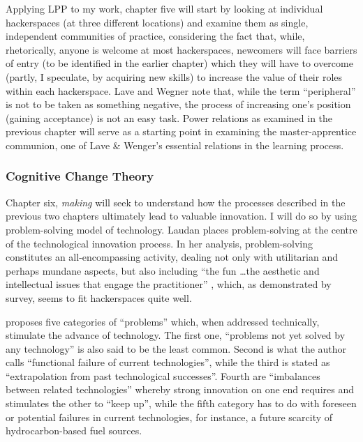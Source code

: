 Applying LPP to my work, chapter five will start by looking at individual hackerspaces (at three different locations) and examine them as single, independent communities of practice, considering the fact that, while, rhetorically, anyone is welcome at most hackerspaces, newcomers will face barriers of entry (to be identified in the earlier chapter) which they will have to overcome (partly, I speculate, by acquiring new skills) to increase the value of their roles within each hackerspace. Lave and Wegner note that, while the term ``peripheral'' is not to be taken as something negative, the process of increasing one's position (gaining acceptance) is not an easy task. Power relations as examined in the previous chapter will serve as a starting point in examining the master-apprentice communion, one of Lave \& Wenger's essential relations in the learning process.

\subsubsection{Cognitive Change Theory}

Chapter six, \textit{making} will seek to understand how the processes described in the previous two chapters ultimately lead to valuable innovation. I will do so by using  problem-solving model of technology. Laudan places problem-solving at the centre of the technological innovation process. In her analysis, problem-solving constitutes an all-encompassing activity, dealing not only with utilitarian and perhaps mundane aspects, but also including ``the fun \ldots the aesthetic and intellectual issues that engage the practitioner'' \citep[p.84]{laudan84}, which, as demonstrated by  survey, seems to fit hackerspaces quite well.

\citeauthor{laudan84} proposes five categories of ``problems'' which, when addressed technically, stimulate the advance of technology. The first one, ``problems not yet solved by any technology'' is also said to be the least common. Second is what the author calls ``functional failure of current technologies'', while the third is stated as ``extrapolation from past technological successes''. Fourth are ``imbalances between related technologies'' whereby strong innovation on one end requires and stimulates the other to ``keep up'', while the fifth category has to do with foreseen or potential failures in current technologies, for instance, a future scarcity of hydrocarbon-based fuel sources.

